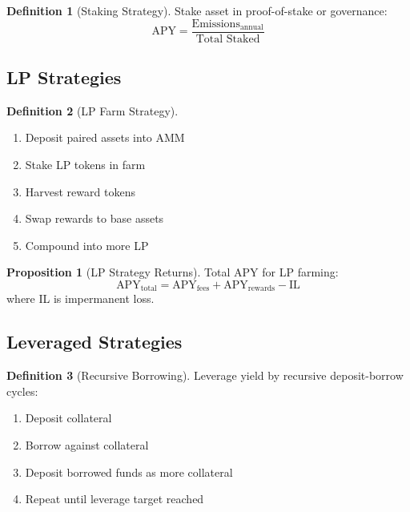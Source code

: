 \documentclass[11pt,a4paper]{article}
\theoremstyle{definition}
\newtheorem{definition}{Definition}
\newtheorem{proposition}{Proposition}
\begin{document}
\begin{definition}[Staking Strategy]
Stake asset in proof-of-stake or governance:
\begin{equation}
\text{APY} = \frac{\text{Emissions}_{\text{annual}}}{\text{Total Staked}}
\end{equation}
\end{definition}

\subsection{LP Strategies}

\begin{definition}[LP Farm Strategy]
\begin{enumerate}
\item Deposit paired assets into AMM
\item Stake LP tokens in farm
\item Harvest reward tokens
\item Swap rewards to base assets
\item Compound into more LP
\end{enumerate}
\end{definition}

\begin{proposition}[LP Strategy Returns]
Total APY for LP farming:
\begin{equation}
\text{APY}_{\text{total}} = \text{APY}_{\text{fees}} + \text{APY}_{\text{rewards}} - \text{IL}
\end{equation}
where IL is impermanent loss.
\end{proposition}

\subsection{Leveraged Strategies}

\begin{definition}[Recursive Borrowing]
Leverage yield by recursive deposit-borrow cycles:
\begin{enumerate}
\item Deposit collateral
\item Borrow against collateral
\item Deposit borrowed funds as more collateral
\item Repeat until leverage target reached
\end{enumerate}
\end{definition}
\end{document}
